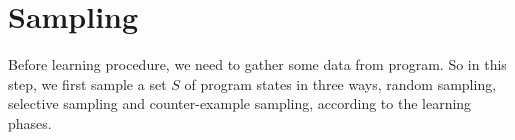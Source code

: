 
\section{Sampling} %
\label{sec:sampling}

Before learning procedure, we need to gather some data from program. 
So in this step, we first sample
a set $S$ of program states in three ways, random sampling, selective sampling and counter-example sampling, 
according to the learning phases.



